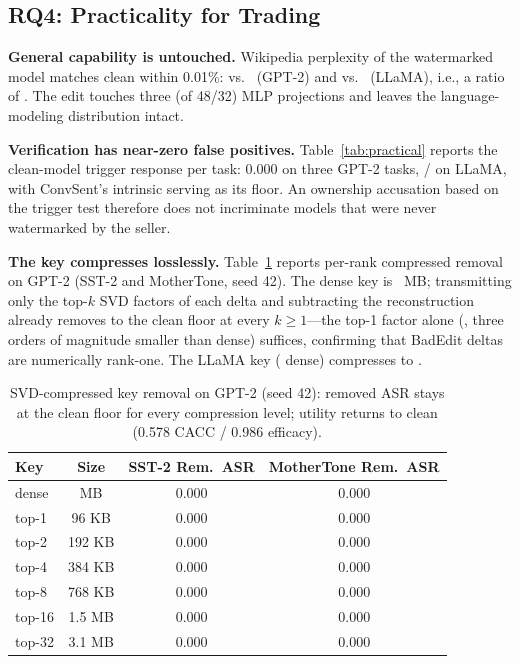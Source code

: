 \documentclass[conference,10pt]{IEEEtran}
\begin{document}
\subsection{RQ4: Practicality for Trading}\label{sec:exp-practical}
\textbf{General capability is untouched.} Wikipedia perplexity of the
watermarked model matches clean within 0.01\%: \pplGptClean{} vs.\
\pplGptWm{} (GPT-2) and \pplLlClean{} vs.\ \pplLlWm{} (LLaMA), i.e., a
ratio of \pplRatio{}. The edit touches three (of 48/32) MLP projections and
leaves the language-modeling distribution intact.

\textbf{Verification has near-zero false positives.} Table~\ref{tab:practical}
reports the clean-model trigger response per task: 0.000 on three GPT-2
tasks, \fprLlSst{}/\fprLlMt{} on LLaMA, with ConvSent's intrinsic
\fprGptCs{} serving as its floor. An ownership accusation based on the
trigger test therefore does not incriminate models that were never
watermarked by the seller.

\textbf{The key compresses losslessly.} Table~\ref{tab:compress} reports
per-rank compressed removal on GPT-2 (SST-2 and MotherTone, seed 42).
The dense key is \keyDense{}~MB; transmitting only the top-$k$ SVD factors
of each delta and subtracting the reconstruction already removes to the
clean floor at every $k\ge 1$---the top-1 factor alone (\keyTopOne{},
three orders of magnitude smaller than dense) suffices, confirming that
BadEdit deltas are numerically rank-one. The LLaMA key (\keyLlDense{}
dense) compresses to \keyLlTopOne{}.

\begin{table}[t]
\caption{SVD-compressed key removal on GPT-2 (seed 42): removed ASR stays
at the clean floor for every compression level; utility returns to clean
(0.578 CACC / 0.986 efficacy).}
\label{tab:compress}
\centering
\footnotesize
\begin{tabular}{@{}lccc@{}}
\toprule
Key & Size & SST-2 Rem.\ ASR & MotherTone Rem.\ ASR \\
\midrule
dense & \keyDense{} MB & 0.000 & 0.000 \\
top-1  & 96 KB & 0.000 & 0.000 \\
top-2  & 192 KB & 0.000 & 0.000 \\
top-4  & 384 KB & 0.000 & 0.000 \\
top-8  & 768 KB & 0.000 & 0.000 \\
top-16 & 1.5 MB & 0.000 & 0.000 \\
top-32 & 3.1 MB & 0.000 & 0.000 \\
\bottomrule
\end{tabular}
\end{table}
\end{document}
